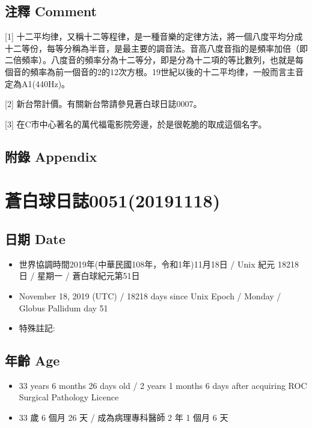 \documentclass[a5paper, 12pt
]{book}
\providecommand{\tightlist}{%
  \setlength{\itemsep}{0pt}\setlength{\parskip}{0pt}}
\begin{document}
\hypertarget{ux6ce8ux91cb-comment-43}{%
\subsection{注釋 Comment}\label{ux6ce8ux91cb-comment-43}}

{[}1{]}
十二平均律，又稱十二等程律，是一種音樂的定律方法，將一個八度平均分成十二等份，每等分稱為半音，是最主要的調音法。音高八度音指的是頻率加倍（即二倍頻率）。八度音的頻率分為十二等分，即是分為十二項的等比數列，也就是每個音的頻率為前一個音的2的12次方根。19世紀以後的十二平均律，一般而言主音定為A1(440Hz)。

{[}2{]} 新台幣計價。有關新台幣請參見蒼白球日誌0007。

{[}3{]} 在C市中心著名的萬代福電影院旁邊，於是很乾脆的取成這個名字。

\hypertarget{ux9644ux9304-appendix-42}{%
\subsection{附錄 Appendix}\label{ux9644ux9304-appendix-42}}

\hypertarget{ux84bcux767dux7403ux65e5ux8a8c005120191118}{%
\section{蒼白球日誌0051(20191118)}\label{ux84bcux767dux7403ux65e5ux8a8c005120191118}}

\hypertarget{ux65e5ux671f-date-50}{%
\subsection{日期 Date}\label{ux65e5ux671f-date-50}}

\begin{itemize}
\tightlist
\item
  世界協調時間2019年(中華民國108年，令和1年)11月18日 / Unix 紀元 18218
  日 / 星期一 / 蒼白球紀元第51日
\item
  November 18, 2019 (UTC) / 18218 days since Unix Epoch / Monday /
  Globus Pallidum day 51
\item
  特殊註記:
\end{itemize}

\hypertarget{ux5e74ux9f61-age-50}{%
\subsection{年齡 Age}\label{ux5e74ux9f61-age-50}}

\begin{itemize}
\tightlist
\item
  33 years 6 months 26 days old / 2 years 1 months 6 days after
  acquiring ROC Surgical Pathology Licence
\item
  33 歲 6 個月 26 天 / 成為病理專科醫師 2 年 1 個月 6 天
\end{itemize}
\end{document}
